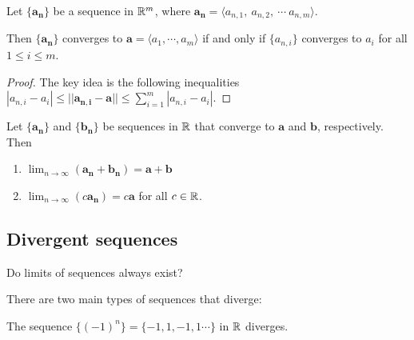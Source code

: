 \begin{theorem}\label{limseqcomponentwise}
    Let $\{\bm{a_n}\}$ be a sequence in $\mathbb{R}^m$, where $\bm{a_n} = \langle a_{n,1},\  a_{n,2},\  \cdots \ a_{n,m} \rangle$.
    
    \vspace{1em}
    
    Then $\{\bm{a_n}\}$ converges to $\bm{a} = \langle a_1, \cdots, a_m \rangle$ if and only if $\{a_{n,i}\}$ converges to $a_i$ for all $1 \leq i \leq m$.
    
    
    \end{theorem}

\begin{proof}
The key idea is the following inequalities $|a_{n,i} - a_i| \leq ||\bm{a_{n,i}} - \bm{a}|| \leq \sum_{i=1}^m |a_{n,i} - a_i|$.
\end{proof}



    \begin{corollary}
    Let $\{\bm{a_n}\}$ and $\{\bm{b_n}\}$ be sequences in $\mathbb{R}$ that converge to $\bm{a}$ and $\bm{b}$, respectively. Then
    
    \begin{enumerate}
        \item $\lim_{n \to \infty}(\bm{a_n} + \bm{b_n}) = \bm{a + b}$
        \item $\lim_{n \to \infty}\left(c\bm{a_n}\right) = c\bm{a}$ for all $c \in \mathbb{R}$.
    \end{enumerate}
    
    
    \end{corollary}







\subsection{Divergent sequences}




\begin{motivating}
Do limits of sequences always exist?
\end{motivating}

There are two main types of sequences that diverge:

    \begin{example}
    The sequence $\{(-1)^n\} = \{-1, 1, -1, 1 \cdots \}$ in $\mathbb{R}$ diverges.
    \end{example}
    
